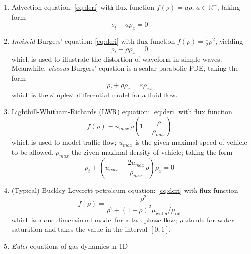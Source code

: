 \documentclass[12pt]{article}
\begin{document}
\begin{enumerate}
	\item Advection equation: \eqref{eq:deri} with flux function
	      $\displaystyle  f(\rho) =  a\rho, \ a\in \mathbb{R^+}$, taking form
	      \begin{equation}
		      \boxed{
			      \rho_{t} + a\rho_{x} = 0
		      }
	      \end{equation}
	\item \emph{Inviscid} Burgers' equation: \eqref{eq:deri} with flux function
	      $\displaystyle  f(\rho) =  \frac{1}{2}\rho^2$, yielding
	      \begin{equation}
		      \boxed{
			      \rho_{t} + \rho\rho_{x} = 0
		      }
	      \end{equation}
	      which is used to illustrate the distortion of waveform in simple waves.
	      Meanwhile, \emph{viscous} Burgers' equation is a scalar parabolic PDE, taking the form
	      $$\rho_t + \rho\rho_{x} = \varepsilon\rho_{xx}$$
	      which is the simplest differential model for a fluid flow.
	\item Lighthill-Whitham-Richards (LWR) equation: \eqref{eq:deri} with flux function
	      $$\displaystyle  f(\rho) =  u_{max}\,\rho\left(1-\frac{\rho}{\rho_{max}}\right)$$
	      which is used to model traffic flow; $u_{max}$ is the given maximal speed of vehicle to be allowed, 
	      $\rho_{max}$ the given maximal density of vehicle; taking the form
	      \begin{equation}
		      \rho_{t} + \left(u_{max}-\frac{2u_{max}}{\rho_{max}}\rho\right)\rho_{x} = 0
	      \end{equation}
	\item (Typical) Buckley-Leverett petroleum equation: \eqref{eq:deri} with flux function
	      $$\displaystyle f(\rho) =  \frac{\rho^2}{\rho^2 + (1-\rho)^2\mu_{\text{water}}/\mu_{\text{oil}}}$$
	      which is a one-dimensional model for a two-phase flow; $\rho$ stands for water saturation
	      and takes the value in the interval $[0,1]$.
	\item \emph{Euler} equations of gas dynamics in 1D

\end{enumerate}
\end{document}
